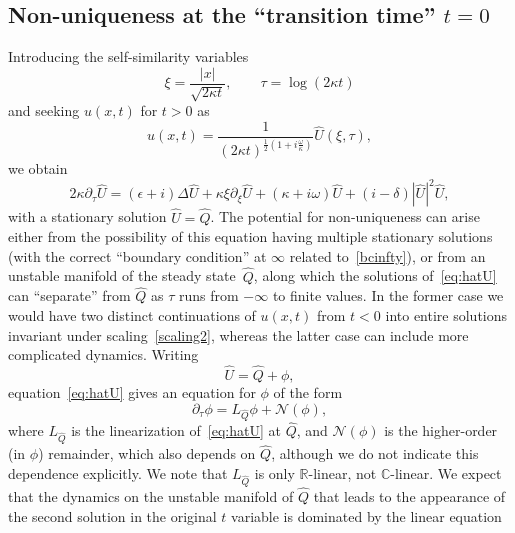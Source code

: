 \documentclass[11pt]{article}
\newcommand{\RR}{\mathbb R}
\begin{document}
\subsection{Non-uniqueness at the ``transition time'' \(t=0\)}
Introducing the self-similarity variables
\begin{equation*}
  \xi=\frac{|x|}{\sqrt{2\kappa t}},\qquad \tau=\log(2\kappa t)
\end{equation*}
and seeking \(u(x,t)\) for \(t>0\) as
\begin{equation*}
  u(x, t) = \frac{1}{(2\kappa t)^{\frac{1}{2}\left(1 + i \frac{\omega}{\kappa}\right)}}
  \hat{U}(\xi, \tau),
\end{equation*}
we obtain
\begin{equation}\label{eq:hatU}
  2\kappa\partial_{\tau} \hat{U}
  = (\epsilon + i)\Delta\hat{U}
  + \kappa\xi\partial_\xi\hat{U}
  + \left(\kappa + i \omega\right)\hat{U}
  + (i - \delta)|\hat{U}|^2\hat{U},
\end{equation}
with a stationary solution \(\hat{U}=\hat{Q}\). The potential for
non-uniqueness can arise either from the possibility of this equation
having multiple stationary solutions (with the correct ``boundary
condition'' at \(\infty\) related to~\eqref{bcinfty}), or from an
unstable manifold of the steady state~\(\hat{Q}\), along which the
solutions of~\eqref{eq:hatU} can ``separate'' from \(\hat{Q}\) as
\(\tau\) runs from \(-\infty\) to finite values. In the former case we
would have two distinct continuations of \(u(x,t)\) from \(t<0\) into
entire solutions invariant under scaling~\eqref{scaling2}, whereas the
latter case can include more complicated dynamics. Writing
\begin{equation*}
  \hat{U}=\hat{Q}+\phi,
\end{equation*}
equation~\eqref{eq:hatU} gives an equation for \(\phi\) of the form
\begin{equation}\label{eq:perturbation-equation}
  \partial_\tau\phi=L_{\hat{Q}}\phi+\mathcal{N}(\phi),
\end{equation}
where \(L_{\hat{Q}}\) is the linearization of~\eqref{eq:hatU} at
\(\hat{Q}\), and \(\mathcal{N}(\phi)\) is the higher-order (in
\(\phi\)) remainder, which also depends on \(\hat{Q}\), although we do
not indicate this dependence explicitly. We note that \(L_{\hat{Q}}\)
is only \(\RR\)-linear, not \(\mathbb{C}\)-linear. We expect that the
dynamics on the unstable manifold of \(\hat{Q}\) that leads to the
appearance of the second solution in the original \(t\) variable is
dominated by the linear equation
\end{document}

